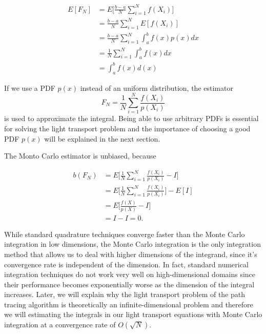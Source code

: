 \begin{equation}
\begin{split}
E[F_N] &= E\Bigg[\frac{b-a}{N}\sum_{i = 1}^{N}f(X_i)\Bigg] \\
&= \frac{b-a}{N}\sum_{i = 1}^{N}E[f(X_i)] \\
&= \frac{b-a}{N}\sum_{i = 1}^{N}\int_{a}^{b}f(x)p(x)dx \\
&= \frac{1}{N}\sum_{i = 1}^{N}\int_{a}^{b}f(x)dx \\
&= \int_{a}^{b}f(x)d(x)
\end{split}
\end{equation}
 
If we use a PDF $p(x)$ instead of an uniform distribution, the estimator
\begin{equation}
F_N = \frac{1}{N}\sum_{i = 1}^{N}\frac{f(X_i)}{p(X_i)}
\end{equation} 
is used to approximate the integral. Being able to use arbitrary PDFs is essential for solving the light transport problem and the importance of choosing a good PDF $p(x)$ will be explained in the next section.

The Monto Carlo estimator is unbiased, because

\begin{equation}
\begin{split}
b(F_N) &= E\Bigg[\frac{1}{N}\sum_{i = 1}^{N}\frac{f(X_i)}{p(X_i)} - I\Bigg] \\
&= E\Bigg[\frac{1}{N}\sum_{i = 1}^{N}\frac{f(X_i)}{p(X_i)}\Bigg] - E[I] \\
&= E\Bigg[\frac{f(X)}{p(X)} - I\Bigg] \\
&= I - I = 0.
\end{split}
\end{equation}

While standard quadrature techniques converge faster than the Monte Carlo integration in low dimensions, the Monte Carlo integration is the only integration method that allows us to deal with higher dimensions of the integrand, since it's convergence rate is independent of the dimension. In fact, standard numerical integration techniques do not work very well on high-dimensional domains since their performance becomes exponentially worse as the dimension of the integral increases. Later, we will explain why the light transport problem of the path tracing algorithm is theoretically an infinite-dimensional problem and therefore we will estimating the integrals in our light transport equations with Monte Carlo integration at a convergence rate of $O(\sqrt{N})$. \cite{RMCM}


